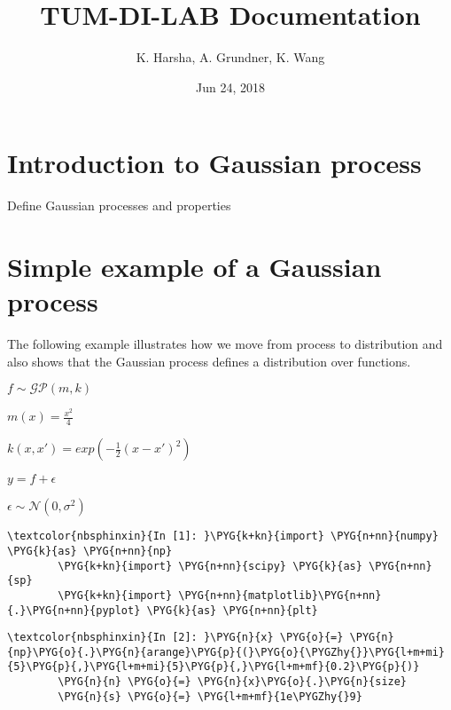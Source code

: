 \documentclass[letterpaper,10pt,english]{sphinxmanual}
\title{TUM-DI-LAB Documentation}
\date{Jun 24, 2018}
\author{K. Harsha, A. Grundner, K. Wang}
\begin{document}
\maketitle
\sphinxtableofcontents
{}\label{\detokenize{index::doc}}



\chapter{Introduction to Gaussian process}
\label{\detokenize{report/1-intro_to_gp:introduction-to-gaussian-process}}\label{\detokenize{report/1-intro_to_gp::doc}}
Define Gaussian processes and properties


\chapter{Simple example of a Gaussian process}
\label{\detokenize{report/2-simple_gp:Simple-example-of-a-Gaussian-process}}\label{\detokenize{report/2-simple_gp::doc}}
The following example illustrates how we move from process to
distribution and also shows that the Gaussian process defines a
distribution over functions.

\(f \sim \mathcal{GP}(m,k)\)

\(m(x) = \frac{x^2}{4}\)

\(k(x,x') = exp(-\frac{1}{2}(x-x')^2)\)

\(y = f + \epsilon\)

\(\epsilon \sim \mathcal{N}(0, \sigma^2)\)

%
\begin{Verbatim}[commandchars=\\\{\}]
\textcolor{nbsphinxin}{In [1]: }\PYG{k+kn}{import} \PYG{n+nn}{numpy} \PYG{k}{as} \PYG{n+nn}{np}
        \PYG{k+kn}{import} \PYG{n+nn}{scipy} \PYG{k}{as} \PYG{n+nn}{sp}
        \PYG{k+kn}{import} \PYG{n+nn}{matplotlib}\PYG{n+nn}{.}\PYG{n+nn}{pyplot} \PYG{k}{as} \PYG{n+nn}{plt}
\end{Verbatim}

%
\begin{Verbatim}[commandchars=\\\{\}]
\textcolor{nbsphinxin}{In [2]: }\PYG{n}{x} \PYG{o}{=} \PYG{n}{np}\PYG{o}{.}\PYG{n}{arange}\PYG{p}{(}\PYG{o}{\PYGZhy{}}\PYG{l+m+mi}{5}\PYG{p}{,}\PYG{l+m+mi}{5}\PYG{p}{,}\PYG{l+m+mf}{0.2}\PYG{p}{)}
        \PYG{n}{n} \PYG{o}{=} \PYG{n}{x}\PYG{o}{.}\PYG{n}{size}
        \PYG{n}{s} \PYG{o}{=} \PYG{l+m+mf}{1e\PYGZhy{}9}
\end{Verbatim}
\end{document}
